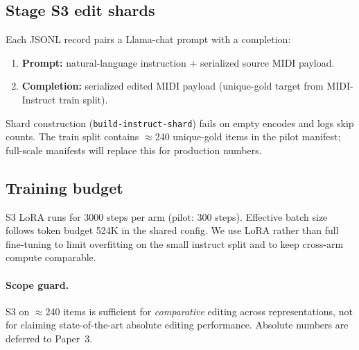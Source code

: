 \subsection{Stage S3 edit shards}

Each JSONL record pairs a Llama-chat prompt with a completion:
\begin{enumerate}[leftmargin=*]
\item \textbf{Prompt:} natural-language instruction + serialized source MIDI payload.
\item \textbf{Completion:} serialized edited MIDI payload (unique-gold target from MIDI-Instruct train split).
\end{enumerate}

Shard construction (\texttt{build-instruct-shard}) fails on empty encodes and logs skip counts. The train split contains $\approx$240 unique-gold items in the pilot manifest; full-scale manifests will replace this for production numbers.

\subsection{Training budget}

S3 LoRA runs for 3000 steps per arm (pilot: 300 steps). Effective batch size follows token budget 524K in the shared config. We use LoRA rather than full fine-tuning to limit overfitting on the small instruct split and to keep cross-arm compute comparable.

\paragraph{Scope guard.}
S3 on $\approx$240 items is sufficient for \emph{comparative} editing across representations, not for claiming state-of-the-art absolute editing performance. Absolute numbers are deferred to Paper~3.
